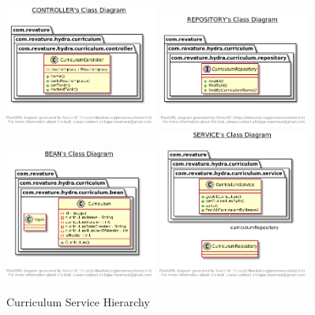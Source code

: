 \begin{figure}[htp]
\centering
\includegraphics[width=5cm]{images/controller}
\includegraphics[width=5cm]{images/curriculumRepo}
\includegraphics[width=5cm]{images/curriculumBean}
\includegraphics[width=5cm]{images/curriculumService}
\caption{Curriculum Service Hierarchy}
\label{fig:lion}
\end{figure}